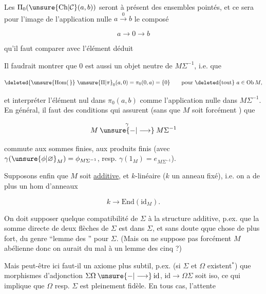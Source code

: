 Les $\Pi_0(\unsure{\mathrm{Ch}|\mathcal C}(a,b))$ seront à présent des ensembles pointés, et ce sera pour l'image de l'application nulle $a\xrightarrow{0}b$  le composé

\[
 a\longrightarrow 0\longrightarrow b
\]

qu'il faut comparer avec l'élément déduit   


Il faudrait montrer que $0$ est aussi un objet neutre de $M\Sigma^{-1}$, i.e. que

\[
 \deleted{\unsure{\mathrm{Hom}(\,}}\ \unsure{\Pi|\pi}_0(a,0)=\pi_0(0,a)=\{0\}\qquad\text{pour }\deleted{\text{tout}}\ a\in\mathrm{Ob}\,M,
\]

et interpréter  l'élément nul dans $\pi_0(a,b)$ comme l'application nulle dans $M\Sigma^{-1}$.  En général, il faut des conditions qui assurent (sans que $M$ soit forcément ) que

\[
 M\mathbin{\overset{\gamma}{\unsure{-|\longrightarrow}}}M\Sigma^{-1}
\]

commute aux sommes finies,  aux produits finis (avec $\gamma(\unsure{\phi|\varnothing}_M)=\phi_{M\Sigma^{-1}}$, resp. $\gamma(1_M)=e_{M\Sigma^{-1}}$).


Supposons enfin que $M$ soit \uline{additive}, et   $k$-linéaire ($k$ un anneau fixé), i.e. on a de plus un hom d'anneaux

\[
 k\longrightarrow\mathrm{End}(\mathrm{id}_M).
\]

On doit supposer quelque compatibilité de $\Sigma$ à la structure additive, p.ex. que la somme directe de deux flèches de $\Sigma$ est dans $\Sigma$, et  sans doute qque chose de plus fort, du genre ``lemme des '' pour $\Sigma$. (Mais on ne suppose pas forcément $M$ abélienne donc on aurait du mal à  un lemme des cinq ?)

Mais peut-être ici faut-il un axiome plus subtil, p.ex. (si $\Sigma$  et $\Omega$ existent$^{*}$) que   morphismes d'adjonction $\Sigma\Omega\mathbin{\unsure{-|\longrightarrow}}\mathrm{id}$, $\mathrm{id}\longrightarrow\Omega\Sigma$ soit iso, ce qui implique que $\Omega$ resp. $\Sigma$ est pleinement fidèle.  En tous cas, l'attente

